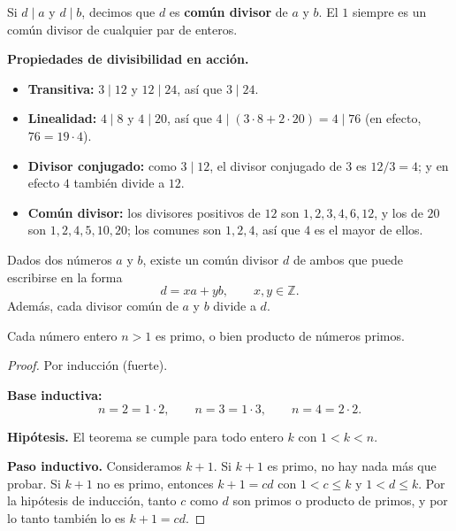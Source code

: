 \documentclass[12pt,a4paper]{book}
\begin{document}
  \begin{definicion}
    Si $d\mid a$ y $d\mid b$, decimos que $d$ es \textbf{común divisor} de $a$ y $b$. El $1$ siempre es un común divisor de cualquier par de enteros.
  \end{definicion}
  
  \begin{ejemplo}
    \textbf{Propiedades de divisibilidad en acción.}
    \begin{itemize}
      \item \textbf{Transitiva:} $3\mid 12$ y $12\mid 24$, así que $3\mid 24$.
      \item \textbf{Linealidad:} $4\mid 8$ y $4\mid 20$, así que $4\mid(3\cdot 8+2\cdot 20)=4\mid 76$ (en efecto, $76=19\cdot 4$).
      \item \textbf{Divisor conjugado:} como $3\mid 12$, el divisor conjugado de $3$ es $12/3=4$; y en efecto $4$ también divide a $12$.
      \item \textbf{Común divisor:} los divisores positivos de $12$ son $1,2,3,4,6,12$, y los de $20$ son $1,2,4,5,10,20$; los comunes son $1,2,4$, así que $4$ es el mayor de ellos.
    \end{itemize}
  \end{ejemplo}
  
  \begin{teorema}
    Dados dos números $a$ y $b$, existe un común divisor $d$ de ambos que puede escribirse en la forma
    \begin{equation*}
      d = xa+yb, \qquad x,y \in \mathbb{Z}.
    \end{equation*}
    Además, cada divisor común de $a$ y $b$ divide a $d$.
  \end{teorema}
  
  \begin{teorema}
    Cada número entero $n>1$ es primo, o bien producto de números primos.
  \end{teorema}
  
  \begin{proof}
    Por inducción (fuerte).
  
    \textbf{Base inductiva:}
    \begin{equation*}
      n=2=1\cdot 2, \qquad n=3=1\cdot 3, \qquad n=4=2\cdot 2.
    \end{equation*}
  
    \textbf{Hipótesis.} El teorema se cumple para todo entero $k$ con $1<k<n$.
  
    \textbf{Paso inductivo.} Consideramos $k+1$. Si $k+1$ es primo, no hay nada más que probar. Si $k+1$ no es primo, entonces $k+1=cd$ con $1<c\leq k$ y $1<d\leq k$. Por la hipótesis de inducción, tanto $c$ como $d$ son primos o producto de primos, y por lo tanto también lo es $k+1=cd$.
  \end{proof}
  
\end{document}
